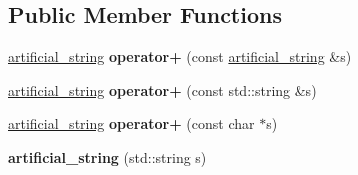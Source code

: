 \subsection*{Public Member Functions}
\begin{DoxyCompactItemize}
\item 
\hypertarget{classartificial__string_adc63e00c5fc5b22dff3865e89882fa26}{\hyperlink{classartificial__string}{artificial\-\_\-string} {\bfseries operator+} (const \hyperlink{classartificial__string}{artificial\-\_\-string} \&s)}\label{classartificial__string_adc63e00c5fc5b22dff3865e89882fa26}

\item 
\hypertarget{classartificial__string_a059d54e7a346a1c0bafceb3dc34fdc84}{\hyperlink{classartificial__string}{artificial\-\_\-string} {\bfseries operator+} (const std\-::string \&s)}\label{classartificial__string_a059d54e7a346a1c0bafceb3dc34fdc84}

\item 
\hypertarget{classartificial__string_af3c69f5263c568a78f2da48f6f71ec3d}{\hyperlink{classartificial__string}{artificial\-\_\-string} {\bfseries operator+} (const char $\ast$s)}\label{classartificial__string_af3c69f5263c568a78f2da48f6f71ec3d}

\item 
\hypertarget{classartificial__string_a8786c2a3eb31d7543fcc1e512d22562a}{{\bfseries artificial\-\_\-string} (std\-::string s)}\label{classartificial__string_a8786c2a3eb31d7543fcc1e512d22562a}


\end{DoxyCompactItemize}
